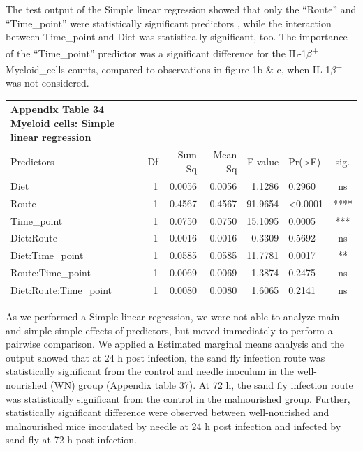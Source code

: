 \documentclass[
  12pt,
  letterpaper,
]{article}
\begin{document}
The test output of the Simple linear regression showed that only the ``Route'' and ``Time\_point'' were statistically significant predictors , while the interaction between Time\_point and Diet was statistically significant, too. The importance of the ``Time\_point'' predictor was a significant difference for the IL-1\(\beta\)\textsuperscript{+} Myeloid\_cells counts, compared to observations in figure 1b \& c, when IL-1\(\beta\)\textsuperscript{+} was not considered.

\begingroup
\fontsize{12.0pt}{14.4pt}\selectfont
\begin{longtable}{l|rrrrlc}
\caption*{
{\large \textbf{Appendix Table 34}} \\ 
{\small \textbf{Myeloid cells: Simple linear regression}}
} \\ 
\toprule
Predictors & {Df} & {Sum Sq} & {Mean Sq} & {F value} & {Pr(>F)} & {sig.} \\ 
\midrule\addlinespace[2.5pt]
Diet & 1 & 0.0056 & 0.0056 & 1.1286 & 0.2960 & ns \\ 
Route & 1 & 0.4567 & 0.4567 & 91.9654 & <0.0001 & **** \\ 
Time\_point & 1 & 0.0750 & 0.0750 & 15.1095 & 0.0005 & *** \\ 
Diet:Route & 1 & 0.0016 & 0.0016 & 0.3309 & 0.5692 & ns \\ 
Diet:Time\_point & 1 & 0.0585 & 0.0585 & 11.7781 & 0.0017 & ** \\ 
Route:Time\_point & 1 & 0.0069 & 0.0069 & 1.3874 & 0.2475 & ns \\ 
Diet:Route:Time\_point & 1 & 0.0080 & 0.0080 & 1.6065 & 0.2141 & ns \\ 
\bottomrule
\end{longtable}
\endgroup

As we performed a Simple linear regression, we were not able to analyze main and simple simple effects of predictors, but moved immediately to perform a pairwise comparison. We applied a Estimated marginal means analysis and the output showed that at 24 h post infection, the sand fly infection route was statistically significant from the control and needle inoculum in the well-nourished (WN) group (Appendix table 37). At 72 h, the sand fly infection route was statistically significant from the control in the malnourished group. Further, statistically significant difference were observed between well-nourished and malnourished mice inoculated by needle at 24 h post infection and infected by sand fly at 72 h post infection.
\end{document}
